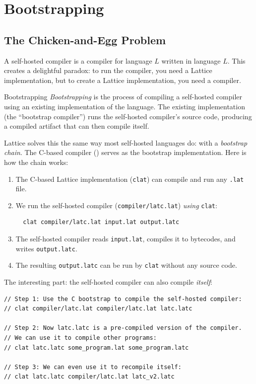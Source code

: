 \section{Bootstrapping}\label{sec:bootstrapping}

\subsection{The Chicken-and-Egg Problem}

A self-hosted compiler is a compiler for language $L$ written in language $L$. This creates a delightful paradox: to run the compiler, you need a Lattice implementation, but to create a Lattice implementation, you need a compiler.

\begin{defnbox}{Bootstrapping}
\emph{Bootstrapping} is the process of compiling a self-hosted compiler using an existing implementation of the language. The existing implementation (the ``bootstrap compiler'') runs the self-hosted compiler's source code, producing a compiled artifact that can then compile itself.
\end{defnbox}

Lattice solves this the same way most self-hosted languages do: with a \emph{bootstrap chain}. The C-based compiler () serves as the bootstrap implementation. Here is how the chain works:

\begin{enumerate}
  \item The C-based Lattice implementation (\lstinline|clat|) can compile and run any \lstinline|.lat| file.
  \item We run the self-hosted compiler (\lstinline|compiler/latc.lat|) \emph{using} \lstinline|clat|:
    \begin{verbatim}
  clat compiler/latc.lat input.lat output.latc
    \end{verbatim}
  \item The self-hosted compiler reads \lstinline|input.lat|, compiles it to bytecodes, and writes \lstinline|output.latc|.
  \item The resulting \lstinline|output.latc| can be run by \lstinline|clat| without any source code.
\end{enumerate}

The interesting part: the self-hosted compiler can also compile \emph{itself}:

\begin{lstlisting}[language=Lattice, caption={Bootstrapping the self-hosted compiler}]
// Step 1: Use the C bootstrap to compile the self-hosted compiler:
// clat compiler/latc.lat compiler/latc.lat latc.latc

// Step 2: Now latc.latc is a pre-compiled version of the compiler.
// We can use it to compile other programs:
// clat latc.latc some_program.lat some_program.latc

// Step 3: We can even use it to recompile itself:
// clat latc.latc compiler/latc.lat latc_v2.latc
\end{lstlisting}


